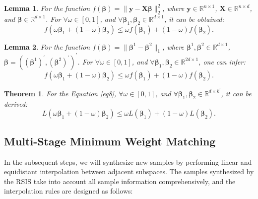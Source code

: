 \documentclass[final,3p,times]{elsarticle}
\newtheorem{theorem}{Theorem}
\newtheorem{lemma}{Lemma}
\begin{document}
\begin{lemma}
\label{lem1}
For the function $f(\boldsymbol{\beta})=\|\boldsymbol{y}-
\boldsymbol{X}\boldsymbol{\beta}\|_2^2$, where 
$\boldsymbol{y}\in\mathbb{R}^{n\times1}$, $\boldsymbol{X}\in
\mathbb{R}^{n\times d}$, and $\boldsymbol{\beta}\in\mathbb{R}
^{d\times1}$. For $\forall\omega\in[0,1]$, and $\forall\boldsymbol
{\beta}_1,\boldsymbol{\beta}_2\in\mathbb{R}^{d\times1}$, it can 
be obtained:
\begin{equation}
\label{eq9}
f(\omega\boldsymbol{\beta}_1+(1-\omega)\boldsymbol{\beta}_2)
\le\omega f(\boldsymbol{\beta}_1)+(1-\omega)f(\boldsymbol{\beta}_2).
\end{equation}
\end{lemma}

\begin{lemma}
\label{lem2}
For the function $f(\boldsymbol{\beta})=\|\boldsymbol{\beta}^1-
\boldsymbol{\beta}^2\|_1$, where $\boldsymbol{\beta}^1,\boldsymbol
{\beta}^2\in\mathbb{R}^{d\times1}$, $\boldsymbol{\beta}=(
(\boldsymbol{\beta}^1)^\prime,(\boldsymbol{\beta}^2)^\prime)
^\prime$. For $\forall\omega\in[0,1]$, and $\forall\boldsymbol
{\beta}_1,\boldsymbol{\beta}_2\in\mathbb{R}^{2d\times1}$, one 
can infer:
\begin{equation}
\label{eq10}
f(\omega\boldsymbol{\beta}_1+(1-\omega)\boldsymbol{\beta}_2)\le
\omega f(\boldsymbol{\beta}_1)+(1-\omega)f(\boldsymbol{\beta}_2).
\end{equation}
\end{lemma}

\begin{theorem}
\label{the1}
For the Equation \eqref{eq8}, $\forall\omega\in[0,1]$, 
and $\forall\boldsymbol{\beta}_1,\boldsymbol{\beta}_2\in
\mathbb{R}^{d\times k^\prime}$, it can be derived:
\begin{equation}
\label{eq11}
L(\omega\boldsymbol{\beta}_1+(1-\omega)\boldsymbol{\beta}_2)
\le\omega L(\boldsymbol{\beta}_1)+(1-\omega)L(\boldsymbol{\beta}_2).
\end{equation}
\end{theorem}

\subsection{Multi-Stage Minimum Weight Matching}
In the subsequent steps, we will synthesize new samples by 
performing linear and equidistant interpolation between adjacent 
subspaces. The samples synthesized by the RSIS take into account 
all sample information comprehensively, and the interpolation 
rules are designed as follows:
\end{document}
